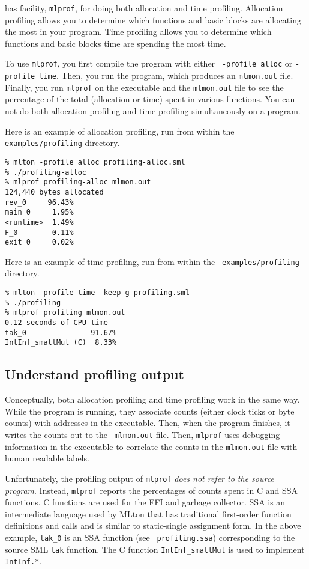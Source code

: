 
{\mlton} has facility, {\tt mlprof}, for doing both allocation and
time profiling.  Allocation profiling allows you to determine which
functions and basic blocks are allocating the most in your program.
Time profiling allows you to determine which functions and basic
blocks time are spending the most time.

To use {\tt mlprof}, you first compile the program with either {\tt
-profile alloc} or {\tt -profile time}.  Then, you run the program,
which produces an {\tt mlmon.out} file.  Finally, you run {\tt mlprof}
on the executable and the {\tt mlmon.out} file to see the percentage
of the total (allocation or time) spent in various functions.
You can not do both allocation profiling and time profiling
simultaneously on a program.

Here is an example of allocation profiling, run from within the {\tt
examples/profiling} directory.

\begin{verbatim}
% mlton -profile alloc profiling-alloc.sml
% ./profiling-alloc
% mlprof profiling-alloc mlmon.out
124,440 bytes allocated
rev_0     96.43%
main_0     1.95%
<runtime>  1.49%
F_0        0.11%
exit_0     0.02%
\end{verbatim}

Here is an example of time profiling, run from within the {\tt
examples/profiling} directory.

\begin{verbatim}
% mlton -profile time -keep g profiling.sml
% ./profiling
% mlprof profiling mlmon.out
0.12 seconds of CPU time
tak_0               91.67%
IntInf_smallMul (C)  8.33%
\end{verbatim}

\subsection{Understand profiling output}

Conceptually, both allocation profiling and time profiling work in the
same way.  While the program is running, they associate counts (either
clock ticks or byte counts) with addresses in the executable.  Then,
when the program finishes, it writes the counts out to the {\tt
mlmon.out} file.  Then, {\tt mlprof} uses debugging information in the
executable to correlate the counts in the {\tt mlmon.out} file with
human readable labels.

Unfortunately, the profiling output of {\tt mlprof} {\em does not
refer to the source program}.  Instead, {\tt mlprof} reports the
percentages of counts spent in C and SSA functions.  C functions are
used for the FFI and garbage collector.  SSA is an intermediate
language used by MLton that has traditional first-order function
definitions and calls and is similar to static-single assignment form.
In the above example, {\tt tak\_0} is an SSA function (see {\tt
profiling.ssa}) corresponding to the source SML {\tt tak} function.
The C function {\tt IntInf\_smallMul} is used to implement {\tt
IntInf.*}.

